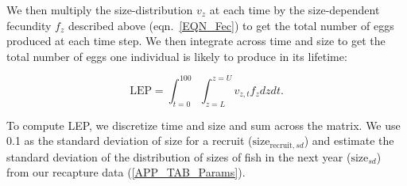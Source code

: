 \documentclass[12pt, oneside]{article}   	%
\begin{document}



We then multiply the size-distribution $v_z$ at each time by the size-dependent fecundity $f_z$ described above (eqn.\ \ref{EQN_Fec}) to get the total number of eggs produced at each time step. We then integrate across time and size to get the total number of eggs one individual is likely to produce in its lifetime:

\begin{equation}
\text{LEP} = \int_{t=0}^{100}\int_{z=L}^{z=U} v_{z,t} f_z dz dt. \label{EQN_LEP}
\end{equation}

To compute LEP, we discretize time and size and sum across the matrix. We use 0.1 as the standard deviation of size for a recruit ($\text{size}_{\text{recruit}, sd}$) and estimate the standard deviation of the distribution of sizes of fish in the next year ($\text{size}_{sd}$) from our recapture data (\ref{APP_TAB_Params}).
\end{document}
